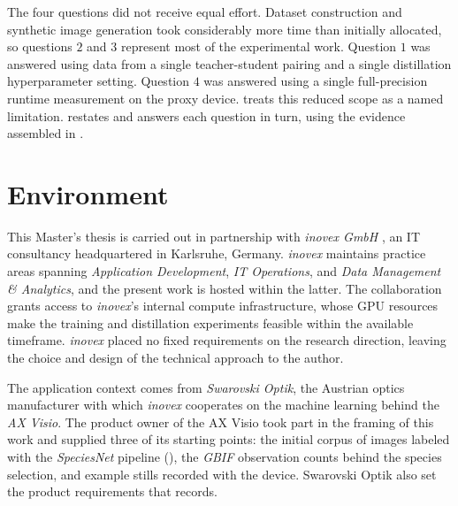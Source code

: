 The four questions did not receive equal effort. Dataset construction and synthetic image generation took considerably more time than initially allocated, so questions $2$ and $3$ represent most of the experimental work. Question $1$ was answered using data from a single teacher-student pairing and a single distillation hyperparameter setting. Question $4$ was answered using a single full-precision runtime measurement on the proxy device.  treats this reduced scope as a named limitation.  restates and answers each question in turn, using the evidence assembled in .

\section{Environment}\label{sec:environment}
This Master's thesis is carried out in partnership with \textit{inovex GmbH} \cite{inovex}, an IT consultancy headquartered in Karlsruhe, Germany. \textit{inovex} maintains practice areas spanning \textit{Application Development}, \textit{IT Operations}, and \textit{Data Management \& Analytics}, and the present work is hosted within the latter. The collaboration grants access to \textit{inovex}'s internal compute infrastructure, whose GPU resources make the training and distillation experiments feasible within the available timeframe. \textit{inovex} placed no fixed requirements on the research direction, leaving the choice and design of the technical approach to the author.

The application context comes from \textit{Swarovski Optik}, the Austrian optics manufacturer with which \textit{inovex} cooperates on the machine learning behind the \textit{AX Visio}.
The product owner of the AX Visio took part in the framing of this work and supplied three of its starting points: the initial corpus of images labeled with the \textit{SpeciesNet} pipeline (), the \textit{GBIF} observation counts behind the species selection, and example stills recorded with the device. Swarovski Optik also set the product requirements that  records.

